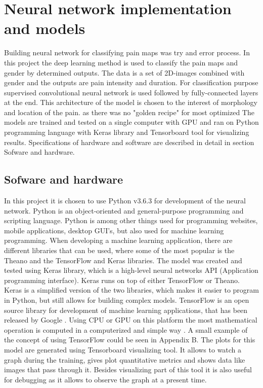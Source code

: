 \section{Neural network implementation and models}
Building neural network for classifying pain maps was try and error process.
In this project the deep learning method is used to classify the pain maps and gender by determined outputs. The data is a set of 2D-images combined with gender and the outputs are pain intensity and duration. For classification purpose supervised convolutional neural network is used followed by fully-connected layers at the end. This architecture of the model is chosen to the interest of morphology and location of the pain. as there was no "golden recipe" for most optimized  The models are trained and tested on a single computer with GPU and ran on Python programming language with Keras library and Tensorboard tool for visualizing results. Specifications of hardware and software are described in detail in section {Sofware and hardware}.

\subsection{Sofware and hardware}
In this project it is chosen to use Python v3.6.3 for development of the neural network. Python is an object-oriented and general-purpose programming and scripting language. Python is among other things used for programming websites, mobile applications, desktop GUI's, but also used for machine learning programming.
When developing a machine learning application, there are different libraries that can be used, where some of the most popular is the Theano and the TensorFlow and Keras libraries.\citep{Swamynathan2017}
The model was created and tested using Keras library, which is a high-level neural networks API (Application programming interface). Keras runs on top of either TensorFlow or Theano. Keras is a simplified version of the two libraries, which makes it easier to program in Python, but still allows for building complex models. TensorFlow is an open source library for development of machine learning applications, that has been released by Google \citep{Swamynathan2017}. 
Using CPU or GPU on this platform the most mathematical operation  is computed in a computerized and simple way \citep{Swamynathan2017}. A small example of the concept of using TensorFlow could be seen in Appendix B. The plots for this model are generated using Tensorboard visualizing tool. It allows to watch a graph during the training, gives plot quantitative metrics and shows data like images that pass through it. Besides visualizing part of this tool it is also useful for debugging as it allows to observe the graph at a present time.\citep{Abadi2016a}


